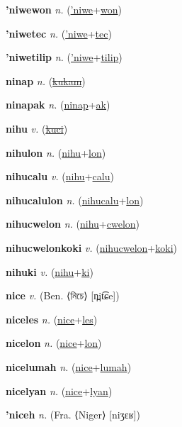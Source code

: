 \textbf{\hypertarget{'niwewon}{'niwewon}} \textit{n.} (\hyperlink{'niwe}{'niwe}+\allowbreak \hyperlink{won}{won})


\textbf{\hypertarget{'niwetec}{'niwetec}} \textit{n.} (\hyperlink{'niwe}{'niwe}+\allowbreak \hyperlink{tec}{tec})


\textbf{\hypertarget{'niwetilip}{'niwetilip}} \textit{n.} (\hyperlink{'niwe}{'niwe}+\allowbreak \hyperlink{tilip}{tilip})


\textbf{\hypertarget{ninap}{ninap}} \textit{n.} (\hyperlink{kukam}{\sout{kukam}})


\textbf{\hypertarget{ninapak}{ninapak}} \textit{n.} (\hyperlink{ninap}{ninap}+\allowbreak \hyperlink{ak}{ak})


\textbf{\hypertarget{nihu}{nihu}} \textit{v.} (\hyperlink{kuci}{\sout{kuci}})


\textbf{\hypertarget{nihulon}{nihulon}} \textit{n.} (\hyperlink{nihu}{nihu}+\allowbreak \hyperlink{lon}{lon})


\textbf{\hypertarget{nihucalu}{nihucalu}} \textit{v.} (\hyperlink{nihu}{nihu}+\allowbreak \hyperlink{calu}{calu})


\textbf{\hypertarget{nihucalulon}{nihucalulon}} \textit{n.} (\hyperlink{nihucalu}{nihucalu}+\allowbreak \hyperlink{lon}{lon})


\textbf{\hypertarget{nihucwelon}{nihucwelon}} \textit{n.} (\hyperlink{nihu}{nihu}+\allowbreak \hyperlink{cwelon}{cwelon})


\textbf{\hypertarget{nihucwelonkoki}{nihucwelonkoki}} \textit{v.} (\hyperlink{nihucwelon}{nihucwelon}+\allowbreak \hyperlink{koki}{koki})


\textbf{\hypertarget{nihuki}{nihuki}} \textit{v.} (\hyperlink{nihu}{nihu}+\allowbreak \hyperlink{ki}{ki})


\textbf{\hypertarget{nice}{nice}} \textit{v.} (Ben. ⟨{\bengali{}নিচে}⟩ [n̪it͡ɕe])


\textbf{\hypertarget{niceles}{niceles}} \textit{n.} (\hyperlink{nice}{nice}+\allowbreak \hyperlink{les}{les})


\textbf{\hypertarget{nicelon}{nicelon}} \textit{n.} (\hyperlink{nice}{nice}+\allowbreak \hyperlink{lon}{lon})


\textbf{\hypertarget{nicelumah}{nicelumah}} \textit{n.} (\hyperlink{nice}{nice}+\allowbreak \hyperlink{lumah}{lumah})


\textbf{\hypertarget{nicelyan}{nicelyan}} \textit{n.} (\hyperlink{nice}{nice}+\allowbreak \hyperlink{lyan}{lyan})


\textbf{\hypertarget{'niceh}{'niceh}} \textit{n.} (Fra. ⟨Niger⟩ [niʒɛʁ])


